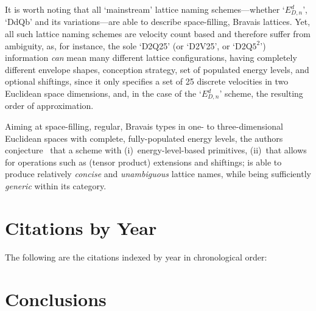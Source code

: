     It is worth noting that all `mainstream' lattice naming schemes---whether `$E_{D,n}^{d}$', `DdQb' and  its  variations---are
    able to describe space-filling, Bravais lattices. Yet, all  such  lattice  naming  schemes  are  velocity  count  based  and
    therefore suffer from ambiguity, as, for instance, the sole `D2Q25' (or `D2V25', or `D2Q$5^2$') information \emph{can}  mean
    many different lattice configurations, having completely different envelope shapes, conception strategy, set  of  populated
    energy levels, and optional shiftings, since it only specifies a set of  25  discrete  velocities  in  two  Euclidean  space
    dimensions, and, in the case of the `$E_{D,n}^{d}$' scheme, the resulting order of approximation.

    Aiming at space-filling, regular, Bravais types in one- to three-dimensional Euclidean spaces with complete, fully-populated
    energy levels,  the  authors  conjecture~\cite{2020-NaaktgeborenC+AndradeFN-BravLatNam-engrXiv-rev00}  that  a  scheme  with
    (i)~energy-level-based primitives, (ii)~that allows for operations such as (tensor product)  extensions  and  shiftings;  is
    able to produce relatively \emph{concise} and \emph{unambiguous} lattice  names,  while  being  sufficiently  \emph{generic}
    within its category.



\section{Citations by Year}

    The following are the citations indexed by year in chronological order: 



\section{Conclusions}

